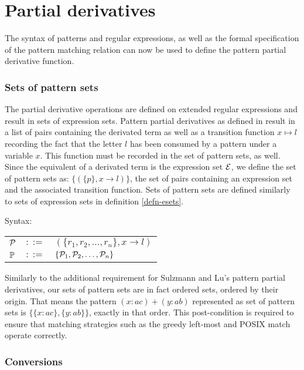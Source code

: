 \section{Partial derivatives}
\label{exprsets}

The syntax of patterns and regular expressions, as well as the formal
specification of the pattern matching relation can now be used to define the
pattern partial derivative function.

\subsubsection{Sets of pattern sets}

The partial derivative operations are defined on extended regular expressions
and result in sets of expression sets. Pattern partial derivatives as defined in
\cite{pdpat} result in a list of pairs containing the derivated term as well as
a transition function $x \mapsto l$ recording the fact that the letter $l$ has
been consumed by a pattern under a variable $x$. This function must be recorded
in the set of pattern sets, as well. Since the equivalent of a derivated term is
the expression set $\mathcal{E}$, we define the set of pattern sets as: $\{ (\{ p \},
x \to l) \}$, the set of pairs containing an expression set and the associated
transition function. Sets of pattern sets are defined similarly to sets of
expression sets in definition \ref{defn-esets}.

\begin{defn}
   \label{defn-psets}
   Syntax:

   \begin{tabular}{lll}
      $\mathcal{P}$	& $::=$ & $(\{r_1, r_2, \dots, r_n\}, x \to l)$ \\
      $\mathbb{P}$	& $::=$ & $\{\mathcal{P}_1, \mathcal{P}_2, \dots, \mathcal{P}_n\}$ \\
   \end{tabular}
\end{defn}

Similarly to the additional requirement for Sulzmann and Lu's pattern partial
derivatives, our sets of pattern sets are in fact ordered sets, ordered by their
origin. That means the pattern $(x:ac)+(y:ab)$ represented as set of pattern
sets is $\{\{x:ac\}, \{y:ab\}\}$, exactly in that order. This post-condition is
required to ensure that matching strategies such as the greedy left-most and
POSIX match operate correctly.


\subsubsection{Conversions}

